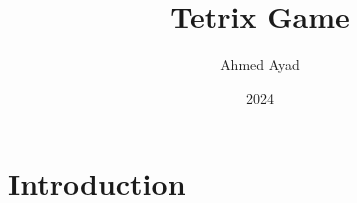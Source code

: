 \documentclass{article}
\title{Tetrix Game}
\author{Ahmed Ayad}
\date{2024}
\begin{document}
\maketitle

\section{Introduction}
\end{document}
